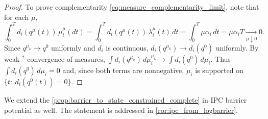 \documentclass{article} %
\begin{document}
\begin{proof}
To prove complementarity \cref{eq:measure_complementarity_limit}, note that for each $\mu$,
\[
\int_0^T d_i(q^\mu(t))\,\mu_i^\mu(dt)
=\int_0^T d_i(q^\mu(t))\,\lambda_i^\mu(t)\,dt
=\int_0^T \mu\alpha_i\,dt
=\mu\alpha_i T \xrightarrow[\mu\downarrow 0]{} 0.
\]
Since $q^{\mu_k}\to q^0$ uniformly and $d_i$ is continuous, $d_i(q^{\mu_k})\to d_i(q^0)$ uniformly.
By weak-$^\ast$ convergence of measures, $\int d_i(q^{\mu_k})\,d\mu_i^{\mu_k}\to \int d_i(q^0)\,d\mu_i$.
Thus $\int d_i(q^0)\,d\mu_i=0$ and, since both terms are nonnegative, $\mu_i$ is supported on $\{t:\ d_i(q^0(t))=0\}$.
\end{proof}

We extend the \cref{prop:barrier_to_state_constrained_complete} in IPC barrier potential as well. The statement is addressed in \cref{cor:ipc_from_logbarrier}.
\end{document}
